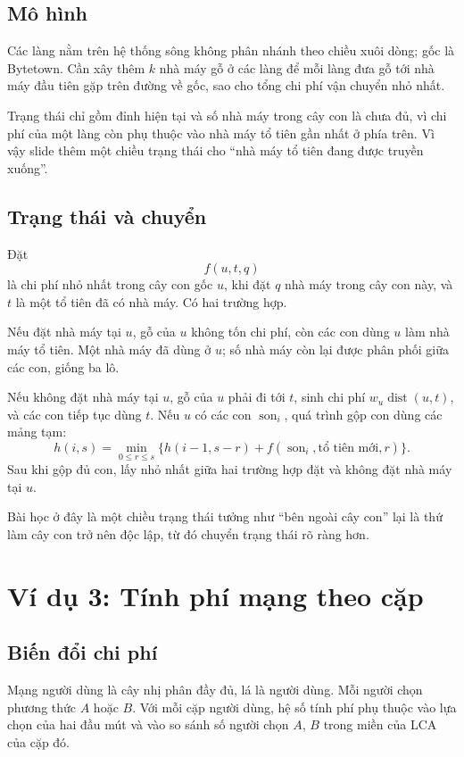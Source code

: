 \documentclass[11pt]{article}
\newcommand{\dist}{\operatorname{dist}}
\begin{document}
\subsection{Mô hình}

Các làng nằm trên hệ thống sông không phân nhánh theo chiều xuôi dòng; gốc là
Bytetown. Cần xây thêm \(k\) nhà máy gỗ ở các làng để mỗi làng đưa gỗ tới nhà
máy đầu tiên gặp trên đường về gốc, sao cho tổng chi phí vận chuyển nhỏ nhất.

Trạng thái chỉ gồm đỉnh hiện tại và số nhà máy trong cây con là chưa đủ, vì
chi phí của một làng còn phụ thuộc vào nhà máy tổ tiên gần nhất ở phía trên.
Vì vậy slide thêm một chiều trạng thái cho ``nhà máy tổ tiên đang được truyền
xuống''.

\subsection{Trạng thái và chuyển}

Đặt
\[
  f(u,t,q)
\]
là chi phí nhỏ nhất trong cây con gốc \(u\), khi đặt \(q\) nhà máy trong cây
con này, và \(t\) là một tổ tiên đã có nhà máy. Có hai trường hợp.

Nếu đặt nhà máy tại \(u\), gỗ của \(u\) không tốn chi phí, còn các con dùng
\(u\) làm nhà máy tổ tiên. Một nhà máy đã dùng ở \(u\); số nhà máy còn lại
được phân phối giữa các con, giống ba lô.

Nếu không đặt nhà máy tại \(u\), gỗ của \(u\) phải đi tới \(t\), sinh chi phí
\(w_u\dist(u,t)\), và các con tiếp tục dùng \(t\). Nếu \(u\) có các con
\(\operatorname{son}_i\), quá trình gộp con dùng các mảng tạm:
\[
  h(i,s)=\min_{0\le r\le s}
  \{h(i-1,s-r)+f(\operatorname{son}_i,\text{tổ tiên mới},r)\}.
\]
Sau khi gộp đủ con, lấy nhỏ nhất giữa hai trường hợp đặt và không đặt nhà máy
tại \(u\).

Bài học ở đây là một chiều trạng thái tưởng như ``bên ngoài cây con'' lại là
thứ làm cây con trở nên độc lập, từ đó chuyển trạng thái rõ ràng hơn.

\section{Ví dụ 3: Tính phí mạng theo cặp}

\subsection{Biến đổi chi phí}

Mạng người dùng là cây nhị phân đầy đủ, lá là người dùng. Mỗi người chọn
phương thức \(A\) hoặc \(B\). Với mỗi cặp người dùng, hệ số tính phí phụ thuộc
vào lựa chọn của hai đầu mút và vào so sánh số người chọn \(A\), \(B\) trong
miền của LCA của cặp đó.
\end{document}
